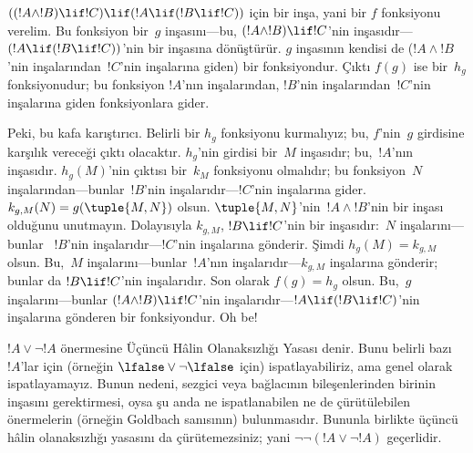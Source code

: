 \documentclass[../../../include/open-logic-section]{subfiles}
\begin{document}
\begin{ex}
$((!A \land !B) \lif !C) \lif (!A \lif (!B \lif !C))$ için bir inşa, yani
bir $f$ fonksiyonu verelim. Bu fonksiyon bir~$g$ inşasını---bu, $(!A \land
!B) \lif !C$'nin inşasıdır---$(!A \lif (!B \lif !C))$'nin bir inşasına
dönüştürür. $g$ inşasının kendisi de ($!A \land !B$'nin inşalarından~$!C$'nin
inşalarına giden) bir fonksiyondur. Çıktı $f(g)$ ise bir~$h_g$ fonksiyonudur;
bu fonksiyon $!A$'nın inşalarından, $!B$'nin inşalarından~$!C$'nin inşalarına
giden fonksiyonlara gider.

Peki, bu kafa karıştırıcı. Belirli bir $h_g$ fonksiyonu kurmalıyız; bu,
$f$'nin~$g$ girdisine karşılık vereceği çıktı olacaktır. $h_g$'nin girdisi
bir~$M$ inşasıdır; bu,~$!A$'nın inşasıdır. $h_g(M)$'nin çıktısı bir~$k_M$
fonksiyonu olmalıdır; bu fonksiyon~$N$ inşalarından---bunlar~$!B$'nin
inşalarıdır---$!C$'nin inşalarına gider. $k_{g,M}(N) = g(\tuple{M, N})$
olsun. $\tuple{M, N}$'nin~$!A \land !B$'nin bir inşası olduğunu unutmayın.
Dolayısıyla $k_{g,M}$, $!B \lif !C$'nin bir inşasıdır:~$N$ inşalarını---bunlar
~$!B$'nin inşalarıdır---$!C$'nin inşalarına gönderir. Şimdi $h_g(M) =
k_{g,M}$ olsun. Bu,~$M$ inşalarını---bunlar~$!A$'nın inşalarıdır---$k_{g,M}$
inşalarına gönderir; bunlar da $!B \lif !C$'nin inşalarıdır. Son olarak
$f(g) = h_g$ olsun. Bu,~$g$ inşalarını---bunlar $(!A \land !B) \lif !C$'nin
inşalarıdır---$!A \lif (!B \lif !C)$'nin inşalarına gönderen bir
fonksiyondur. Oh be!{}
\end{ex}

$!A \lor \lnot !A$ önermesine Üçüncü Hâlin Olanaksızlığı Yasası denir. Bunu
belirli bazı $!A$'lar için (örneğin $\lfalse \lor \lnot \lfalse$ için)
ispatlayabiliriz, ama genel olarak ispatlayamayız. Bunun nedeni, sezgici veya
bağlacının bileşenlerinden birinin inşasını gerektirmesi, oysa şu anda ne
ispatlanabilen ne de çürütülebilen önermelerin (örneğin Goldbach sanısının)
bulunmasıdır. Bununla birlikte üçüncü hâlin olanaksızlığı yasasını da
çürütemezsiniz; yani $\lnot \lnot (!A \lor \lnot !A)$ geçerlidir.
\end{document}
